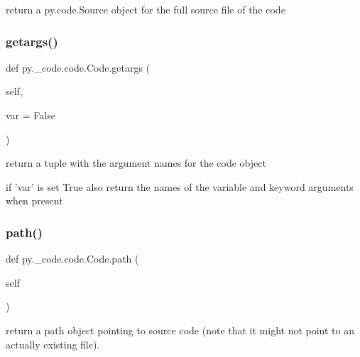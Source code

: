 \begin{DoxyVerb}return a py.code.Source object for the full source file of the code
\end{DoxyVerb}
 \mbox{\label{classpy_1_1__code_1_1code_1_1_code_ae3526891049d1b433a3e86b8fe03077c}} 
\subsubsection{\texorpdfstring{getargs()}{getargs()}}
{\footnotesize\ttfamily def py.\+\_\+code.\+code.\+Code.\+getargs (\begin{DoxyParamCaption}\item[{}]{self,  }\item[{}]{var = {\ttfamily False} }\end{DoxyParamCaption})}

\begin{DoxyVerb}return a tuple with the argument names for the code object

    if 'var' is set True also return the names of the variable and
    keyword arguments when present
\end{DoxyVerb}
 \mbox{\label{classpy_1_1__code_1_1code_1_1_code_a84e26981617ad90d0fe872b367058f29}} 
\subsubsection{\texorpdfstring{path()}{path()}}
{\footnotesize\ttfamily def py.\+\_\+code.\+code.\+Code.\+path (\begin{DoxyParamCaption}\item[{}]{self }\end{DoxyParamCaption})}

\begin{DoxyVerb}return a path object pointing to source code (note that it
might not point to an actually existing file). \end{DoxyVerb}
 \mbox{\label{classpy_1_1__code_1_1code_1_1_code_a9edbde33c7061882644a27dae8fb3441}} 
